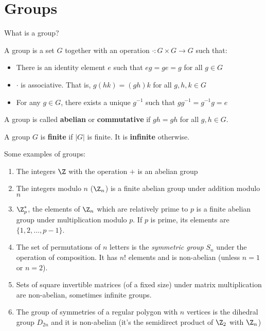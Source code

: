 
\section{Groups}

What is a group?

A group is a set $G$ together with an operation $\cdot : G\times G \rightarrow G$ such that:

\begin{itemize}
	\item There is an identity element $e$ such that $eg = ge = g$ for all $g\in G$
	\item $\cdot$ is associative.  That is, $g(hk) = (gh)k$ for all $g,h,k\in G$
	\item For any $g\in G$, there exists a unique $g^{-1}$ such that $gg^{-1}=g^{-1}g= e$
\end{itemize}


\begin{definition}
	{A group is called \textbf{abelian} or \textbf{commutative} if $gh=gh$ for all $g,h\in G$.}
\end{definition}

\begin{definition}
	A group $G$ is \textbf{finite} if $|G|$ is finite. It is \textbf{infinite} otherwise.
\end{definition}

Some examples of groups:
\begin{enumerate}
	\item The integers $\Z$ with the operation $+$ is an abelian group
	\item The integers modulo $n$ ($\Z_n$) is a finite abelian group under addition modulo $n$
	\item $\Z_p^*$, the elements of $\Z_n$ which are relatively prime to $p$ is a finite abelian group under multiplication modulo $p$. If $p$ is prime, its elements are $\{1,2,\dots,p-1\}$.
	\item The set of permutations of $n$ letters is the \textit{symmetric group} $S_n$ under the operation of composition. It has $n!$ elements and is non-abelian (unless $n=1$ or $n=2$).
	\item Sets of square invertible matrices (of a fixed size) under matrix multiplication are non-abelian, sometimes infinite groups.
	\item The group of symmetries of a regular polygon with $n$ vertices is the dihedral group $D_{2n}$ and it is non-abelian (it's the semidirect product of $\Z_2$ with $\Z_n$)
\end{enumerate}


